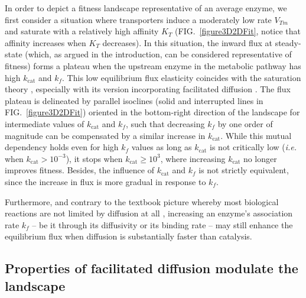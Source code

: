 \documentclass[11pt,onecolumn]{article}
\begin{document}
In order to depict a fitness landscape representative of an average enzyme, we first consider a situation where transporters induce a moderately low rate $V_{Tm}$ and saturate with a relatively high affinity $K_T$ (FIG.~\ref{figure3D2DFit}, notice that affinity increases when $K_T$ decreases). In this situation, the inward flux at steady-state (which, as argued in the introduction, can be considered representative of fitness) forms a plateau when the upstream enzyme in the metabolic pathway has high $k_\text{cat}$ and $k_f$. This low equilibrium flux elasticity coincides with the saturation theory \citep{Wright34, Kacser73,Hartl85,Dykhuizen87,Dean95,Yi19}, especially with its version incorporating facilitated diffusion \citep{Kuile94,Dean95}. The flux plateau is delineated by parallel isoclines (solid and interrupted lines in FIG.~\ref{figure3D2DFit}) oriented in the bottom-right direction of the landscape for intermediate values of $k_\text{cat}$ and $k_f$, such that decreasing $k_f$ by one order of magnitude can be compensated by a similar increase in $k_\text{cat}$. While this mutual dependency holds even for high $k_f$ values as long as $k_\text{cat}$ is not critically low (\textit{i.e.} when $k_\text{cat}>10^{-3}$), it stops when $k_\text{cat}\geq 10^3$, where increasing $k_\text{cat}$ no longer improves fitness. 
Besides, the influence of $k_\text{cat}$ and $k_f$ is not strictly equivalent, since the increase in flux is more gradual in response to $k_f$. 
 
Furthermore, and contrary to the textbook picture whereby most biological reactions are not limited by diffusion at all \citep{Bar-Even11,Sweetlove18}, increasing an enzyme's association rate $k_f$ – be it through its diffusivity or its binding rate – may still enhance the equilibrium flux when diffusion is substantially faster than catalysis.

\subsection{Properties of facilitated diffusion modulate the landscape}
\end{document}
